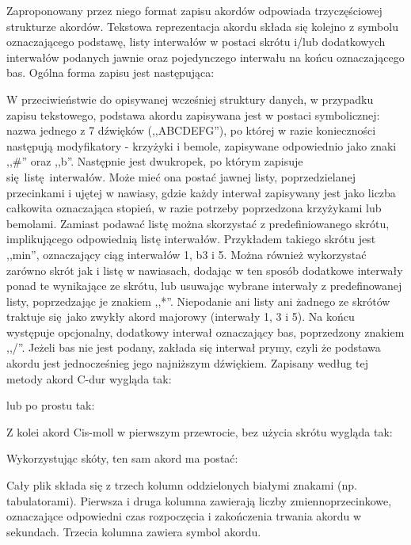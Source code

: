 Zaproponowany przez niego format zapisu akordów odpowiada trzyczęściowej strukturze akordów.
Tekstowa reprezentacja akordu składa się kolejno z symbolu oznaczającego podstawę, listy interwałów
w postaci skrótu i/lub dodatkowych interwałów podanych jawnie oraz pojedynczego interwału na końcu
oznaczającego bas. Ogólna forma zapisu jest następująca: 
\begin{center}
\end{center}
W przeciwieństwie do opisywanej wcześniej struktury danych, w przypadku zapisu tekstowego, podstawa
akordu zapisywana jest w postaci symbolicznej: nazwa jednego z 7 dźwięków (,,ABCDEFG''), po której w
razie konieczności następują modyfikatory - krzyżyki i bemole, zapisywane odpowiednio jako znaki
,,\#'' oraz ,,b''. Następnie jest dwukropek, po którym zapisuje się listę interwałów. Może mieć ona
postać jawnej listy, poprzedzielanej przecinkami i ujętej w nawiasy, gdzie każdy interwał zapisywany
jest jako liczba całkowita oznaczająca stopień, w razie potrzeby poprzedzona krzyżykami lub
bemolami. Zamiast podawać listę można skorzystać z predefiniowanego skrótu, implikującego
odpowiednią listę interwałów. Przykładem takiego skrótu jest ,,min'', oznaczający ciąg interwałów
1, b3 i 5. Można również wykorzystać zarówno skrót jak i listę w nawiasach, dodając w ten
sposób dodatkowe interwały ponad te wynikające ze skrótu, lub usuwając wybrane interwały z
predefinowanej listy, poprzedzając je znakiem ,,*''. Niepodanie ani listy ani żadnego ze skrótów
traktuje się jako zwykły akord majorowy (interwały 1, 3 i 5). Na końcu występuje opcjonalny,
dodatkowy interwał oznaczający bas, poprzedzony znakiem ,,/''. Jeżeli bas nie jest podany, zakłada
się interwał prymy, czyli że podstawa akordu jest jednocześnieg jego najniższym dźwiękiem. Zapisany
według tej metody akord C-dur wygląda tak:
\begin{center}
\end{center}
lub po prostu tak:
\begin{center}
\end{center}
Z kolei akord Cis-moll w pierwszym przewrocie, bez użycia skrótu wygląda tak:
\begin{center}
\end{center}
Wykorzystując skóty, ten sam akord ma postać:
\begin{center}
\end{center}
Cały plik  składa się z trzech kolumn oddzielonych białymi znakami (np. tabulatorami).
Pierwsza i druga kolumna zawierają liczby zmiennoprzecinkowe, oznaczające odpowiedni czas
rozpoczęcia i zakończenia trwania akordu w sekundach. Trzecia kolumna zawiera symbol akordu.

